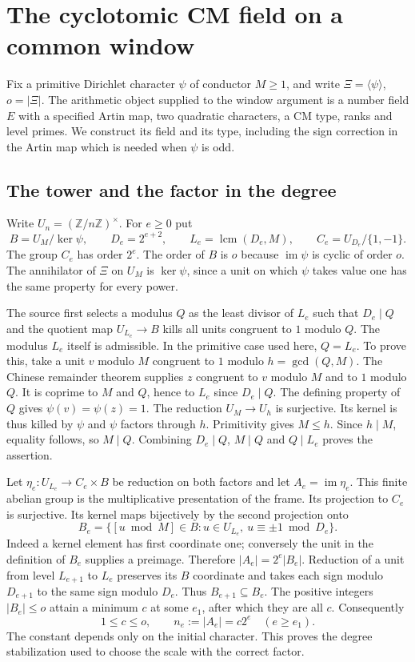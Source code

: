 \section{The cyclotomic CM field on a common window}
\label{sec:host-field}

Fix a primitive Dirichlet character $\psi$ of conductor $M\geq 1$, and
write $\Xi=\langle\psi\rangle$, $o=|\Xi|$. The arithmetic object supplied
to the window argument is a number field $E$ with a specified Artin map,
two quadratic characters, a CM type, ranks and level primes. We construct
its field and its type, including the sign correction in the Artin map
which is needed when $\psi$ is odd.

\subsection{The tower and the factor in the degree}

Write $U_n=(\mathbb Z/n\mathbb Z)^\times$. For $e\geq 0$ put
\[
 B=U_M/\ker\psi,\qquad D_e=2^{e+2},\qquad
 L_e=\operatorname{lcm}(D_e,M),\qquad C_e=U_{D_e}/\{1,-1\}.
\]
The group $C_e$ has order $2^e$. The order of $B$ is $o$ because
$\operatorname{im}\psi$ is cyclic of order $o$. The annihilator of
$\Xi$ on $U_M$ is $\ker\psi$, since a unit on which $\psi$ takes value one has the same property for
every power.

The source first selects a modulus $Q$ as the least divisor of $L_e$
such that $D_e\mid Q$ and the quotient map $U_{L_e}\to B$ kills all
units congruent to $1$ modulo $Q$. The modulus $L_e$ itself is
admissible. In the primitive case used here, $Q=L_e$. To prove this,
take a unit $v$ modulo $M$ congruent to $1$ modulo $h=\gcd(Q,M)$.
The Chinese remainder theorem supplies $z$ congruent to $v$ modulo
$M$ and to $1$ modulo $Q$. It is coprime to $M$ and $Q$, hence to
$L_e$ since $D_e\mid Q$. The defining property of $Q$ gives
$\psi(v)=\psi(z)=1$. The reduction $U_M\to U_h$ is surjective.
Its kernel is thus killed by $\psi$ and $\psi$ factors through $h$.
Primitivity gives $M\le h$. Since $h\mid M$, equality follows,
so $M\mid Q$. Combining $D_e\mid Q$, $M\mid Q$ and $Q\mid L_e$
proves the assertion.

Let $\eta_e:U_{L_e}\to C_e\times B$ be reduction on both factors and
let $A_e=\operatorname{im}\eta_e$. This finite abelian group is the
multiplicative presentation of the frame. Its projection to $C_e$
is surjective. Its kernel maps bijectively by the second projection
onto
\[
 B_e=\bigl\{[u\bmod M]\in B: u\in U_{L_e},\
                                   u\equiv\pm1\bmod D_e\bigr\}.
\]
Indeed a kernel element has first coordinate one; conversely the unit
in the definition of $B_e$ supplies a preimage. Therefore
$|A_e|=2^e|B_e|$. Reduction of a unit from level $L_{e+1}$ to $L_e$
preserves its $B$ coordinate and takes each sign modulo $D_{e+1}$
to the same sign modulo $D_e$. Thus $B_{e+1}\subseteq B_e$. The
positive integers $|B_e|\le o$ attain a minimum $c$ at some $e_1$,
after which they are all $c$. Consequently
\[
          1\le c\le o,\qquad n_e:=|A_e|=c2^e \quad(e\ge e_1).
\]
The constant depends only on the initial character. This proves the
degree stabilization used to choose the scale with the correct factor.

